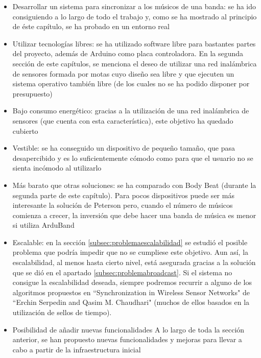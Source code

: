 \begin{itemize}
  \item Desarrollar un sistema para sincronizar a los músicos de una banda:
    se ha ido consiguiendo a lo largo de todo el trabajo y, como se ha mostrado al principio
    de éste capítulo, se ha probado en un entorno real
  \item Utilizar tecnologías libres:
    se ha utilizado software libre para bastantes partes del proyecto, además de Arduino
    como placa controladora. En la segunda sección de este capítulos, se menciona el deseo de utilizar
    una red inalámbrica de sensores formada por motas cuyo diseño sea libre y que ejecuten un sistema operativo
    también libre (de los cuales no se ha podido disponer por presupuesto)
  \item Bajo consumo energético:
    gracias a la utilización de una red inalámbrica de sensores (que cuenta con esta característica),
     este objetivo ha quedado cubierto
  \item Vestible:
    se ha conseguido un dispositivo de pequeño tamaño, que pasa desapercibido y es lo suficientemente
    cómodo como para que el usuario no se sienta incómodo al utilizarlo
  \item Más barato que otras soluciones:
    se ha comparado con Body Beat (durante la segunda parte de este capítulo). Para pocos dispositivos
    puede ser más interesante la solución de Peterson pero, cuando el número de músicos comienza a
    crecer, la inversión que debe hacer una banda de música es menor si utiliza ArduBand
  \item Escalable:
    en la sección \ref{subsec:problemaescalabilidad} se estudió el posible  problema que podría impedir
    que no se cumpliese este objetivo. Aun así, la escalabilidad, al menos hasta cierto nivel, está asegurada
    gracias a la solución que se dió en el apartado \ref{subsec:problemabroadcast}. Si el sistema no consigue
    la escalabilidad deseada, siempre podremos recurrir a alguno de los algoritmos propuestos en ``Synchronization
    in Wireless Sensor Networks" de ``Erchin Serpedin and Qasim M. Chaudhari" \cite{serpedin} (muchos de ellos basados
    en la utilización de sellos de tiempo).
  \item Posibilidad de añadir nuevas funcionalidades
    A lo largo de toda la sección anterior, se han propuesto nuevas funcionalidades y mejoras para llevar
    a cabo a partir de la infraestructura inicial
\end{itemize}
